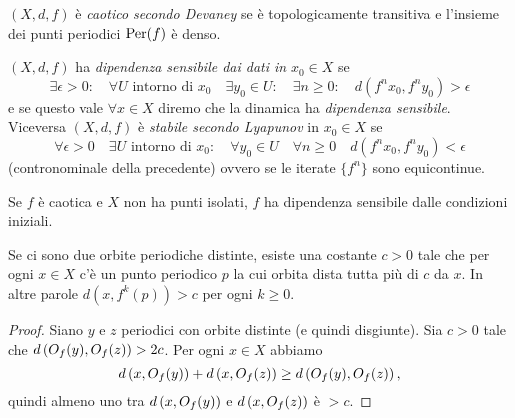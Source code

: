 \begin{defi} $(X,d,f)$ è \emph{caotico secondo Devaney} se è topologicamente transitiva e l'insieme dei punti periodici $\operatorname{Per}(f)$ è denso.
\end{defi}


\begin{defi}$(X,d,f)$ ha \emph{dipendenza sensibile dai dati in} $x_0\in X$ se 
 \[\exists \epsilon>0:\quad \forall U \mbox{ intorno di } x_0 \quad \exists y_0\in U:\quad\exists n\geq 0: \quad d(f^nx_0,f^ny_0)>\epsilon\]
 e se questo vale $\forall x\in X$ diremo che la dinamica ha \emph{dipendenza sensibile}.
 Viceversa $(X,d,f)$ è \emph{stabile secondo Lyapunov} in $x_0\in X$ se
 \[\forall \epsilon>0 \quad \exists U \mbox{ intorno di } x_0: \quad \forall y_0\in U\quad\forall n\geq 0 \quad d(f^nx_0,f^ny_0)<\epsilon\]
 (contronominale della precedente) ovvero se le iterate $\{f^n\}$ sono equicontinue.
\end{defi}

\begin{teo}Se $f$ è caotica e $X$ non ha punti isolati, $f$ ha dipendenza sensibile dalle condizioni iniziali.
\end{teo}

\begin{lem}Se ci sono due orbite periodiche distinte, esiste una costante $c>0$ tale che per ogni $x\in X$
c'è un punto periodico $p$ la cui orbita dista tutta più di $c$ da $x$. In altre parole
$d(x,f^k(p))>c$ per ogni $k\ge 0$.
\end{lem}

\begin{proof}Siano $y$ e $z$ periodici con orbite distinte (e quindi disgiunte).
Sia $c>0$ tale che $d\left(O_f(y),O_f(z)\right)>2c$. Per ogni $x\in X$ abbiamo
\[ d\left(x,O_f(y)\right)+d\left(x,O_f(z)\right)\ge d\left(O_f(y),O_f(z)\right), \]
quindi almeno uno tra $d\left(x,O_f(y)\right)$ e $d\left(x,O_f(z)\right)$ è $>c$.
\end{proof}

